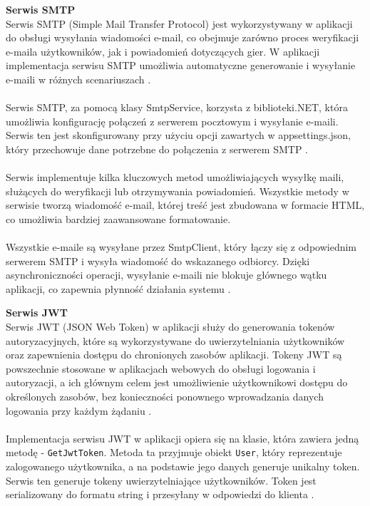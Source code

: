 \documentclass[twoside]{projektInzynierskiMS1}
\begin{document}
\noindent \textbf{Serwis SMTP}\\
Serwis SMTP (Simple Mail Transfer Protocol) jest wykorzystywany w aplikacji do obsługi wysyłania wiadomości e-mail, co obejmuje zarówno proces weryfikacji e-maila użytkowników, jak i powiadomień dotyczących gier. W aplikacji implementacja serwisu SMTP umożliwia automatyczne generowanie i wysyłanie e-maili w różnych scenariuszach \cite{SMTP}.
\\\\
Serwis SMTP, za pomocą klasy SmtpService, korzysta z biblioteki.NET, która umożliwia konfigurację połączeń z serwerem pocztowym i wysyłanie e-maili. Serwis ten jest skonfigurowany przy użyciu opcji zawartych w appsettings.json, który przechowuje dane potrzebne do połączenia z serwerem SMTP \cite{SMTP}.
\\\\
Serwis implementuje kilka kluczowych metod umożliwiających wysyłkę maili, służących do weryfikacji lub otrzymywania powiadomień. Wszystkie metody w serwisie tworzą wiadomość e-mail, której treść jest zbudowana w formacie HTML, co umożliwia bardziej zaawansowane formatowanie.
\\\\
Wszystkie e-maile są wysyłane przez SmtpClient, który łączy się z odpowiednim serwerem SMTP i wysyła wiadomość do wskazanego odbiorcy. Dzięki asynchroniczności operacji, wysyłanie e-maili nie blokuje głównego wątku aplikacji, co zapewnia płynność działania systemu \cite{SMTP}.

\vspace{1cm}

\noindent \textbf{Serwis JWT}\\
Serwis JWT (JSON Web Token) w aplikacji służy do generowania tokenów autoryzacyjnych, które są wykorzystywane do uwierzytelniania użytkowników oraz zapewnienia dostępu do chronionych zasobów aplikacji. Tokeny JWT są powszechnie stosowane w aplikacjach webowych do obsługi logowania i autoryzacji, a ich głównym celem jest umożliwienie użytkownikowi dostępu do określonych zasobów, bez konieczności ponownego wprowadzania danych logowania przy każdym żądaniu \cite{JWT}.
\\\\
Implementacja serwisu JWT w aplikacji opiera się na klasie, która zawiera jedną metodę - \texttt{GetJwtToken}. Metoda ta przyjmuje obiekt \texttt{User}, który reprezentuje zalogowanego użytkownika, a na podstawie jego danych generuje unikalny token. Serwis ten generuje tokeny uwierzytelniające użytkowników. Token jest serializowany do formatu string i przesyłany w odpowiedzi do klienta \cite{JWT}.
\end{document}
